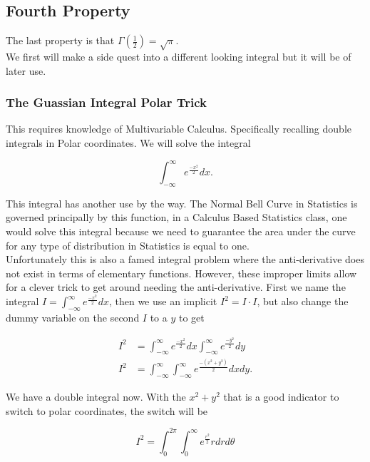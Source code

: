 \documentclass[12pt]{article}
\begin{document}
\subsection{Fourth Property}

The last property is that $\Gamma\left(\frac{1}{2}\right)=\sqrt{\pi}$. \\

We first will make a side quest into a different looking integral but it will be of later use.

\subsubsection{The Guassian Integral Polar Trick}

This requires knowledge of Multivariable  Calculus. Specifically recalling double integrals in Polar coordinates. We will solve the integral

\begin{equation*}
    \int_{-\infty}^{\infty} e^{\frac{-x^2}{2}} dx.
\end{equation*}

This integral has another use by the way. The Normal Bell Curve in Statistics is governed principally by this function, in a Calculus Based Statistics class, one would solve this integral because we need to guarantee the area under the curve for any type of distribution in Statistics is equal to one. \\

Unfortunately this is also a famed integral problem where the anti-derivative does not exist in terms of elementary functions. However, these improper limits allow for a clever trick to get around needing the anti-derivative. First we name the integral $I=\int_{-\infty}^{\infty} e^{\frac{-x^2}{2}} dx$, then we use an implicit $I^2=I\cdot I$, but also change the dummy variable on the second $I$ to a $y$ to get

\begin{align*}
    I^2 &= \int_{-\infty}^{\infty} e^{\frac{-x^2}{2}} dx \int_{-\infty}^{\infty} e^{\frac{-y^2}{2}} dy \\
    I^2 &= \int_{-\infty}^{\infty}\int_{-\infty}^{\infty} e^{\frac{-(x^2+y^2)}{2}} dxdy.
\end{align*}

We have a double integral now. With the $x^2+y^2$ that is a good indicator to switch to polar coordinates, the switch will be

\begin{equation*}
    I^2 = \int_{0}^{2\pi}\int_{0}^{\infty} e^{\frac{r^2}{2}} rdrd\theta
\end{equation*}
\end{document}
